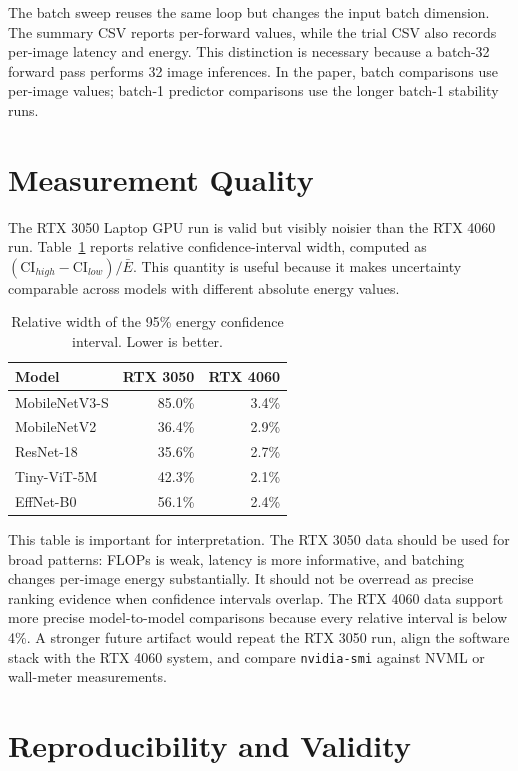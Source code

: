 \documentclass[conference]{IEEEtran}
\begin{document}
The batch sweep reuses the same loop but changes the input batch dimension.
The summary CSV reports per-forward values, while the trial CSV also records
per-image latency and energy. This distinction is necessary because a batch-32
forward pass performs 32 image inferences. In the paper, batch comparisons use
per-image values; batch-1 predictor comparisons use the longer batch-1
stability runs.

\section{Measurement Quality}

The RTX 3050 Laptop GPU run is valid but visibly noisier than the RTX 4060 run.
Table~\ref{tab:relci} reports relative confidence-interval width, computed as
$(\mathrm{CI}_{high}-\mathrm{CI}_{low})/\bar{E}$. This quantity is useful
because it makes uncertainty comparable across models with different absolute
energy values.

\begin{table}[t]
\centering
\caption{Relative width of the 95\% energy confidence interval. Lower is
better.}
\label{tab:relci}
\scriptsize
\begin{tabular}{@{}lrr@{}}
\toprule
Model & RTX 3050 & RTX 4060\\
\midrule
MobileNetV3-S & 85.0\% & 3.4\%\\
MobileNetV2 & 36.4\% & 2.9\%\\
ResNet-18 & 35.6\% & 2.7\%\\
Tiny-ViT-5M & 42.3\% & 2.1\%\\
EffNet-B0 & 56.1\% & 2.4\%\\
\bottomrule
\end{tabular}
\end{table}

This table is important for interpretation. The RTX 3050 data should be used
for broad patterns: FLOPs is weak, latency is more informative, and batching
changes per-image energy substantially. It should not be overread as precise
ranking evidence when confidence intervals overlap. The RTX 4060 data support
more precise model-to-model comparisons because every relative interval is
below 4\%. A stronger future artifact would repeat the RTX 3050 run, align the
software stack with the RTX 4060 system, and compare \texttt{nvidia-smi}
against NVML or wall-meter measurements.

\section{Reproducibility and Validity}
\end{document}
